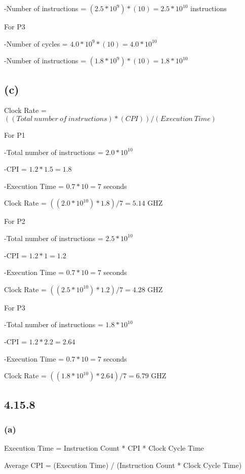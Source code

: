 \documentclass{article}
\begin{document}
    -Number of instructions = $(2.5 * 10^9) * (10) = 2.5 * 10^{10}$ instructions

    \vspace{6pt}

    For P3

    -Number of cycles = ${4.0 * 10^9} * (10) = 4.0 * 10^{10}$

    -Number of instructions = $(1.8 * 10^9) * (10) = 1.8 * 10^{10}$

    \subsection*{(c)}

    Clock Rate = $((Total\ number\ of\ instructions) * (CPI)) / (Execution\ Time)$

    For P1

    -Total number of instructions = $2.0 * 10^{10}$

    -CPI = $1.2 * 1.5 = 1.8$

    -Execution Time = $0.7 * 10 = 7$ seconds

    Clock Rate = $((2.0 * 10^{10}) * 1.8)/7 = 5.14$ GHZ

    For P2

    -Total number of instructions = $2.5 * 10^{10}$

    -CPI = $1.2 * 1 = 1.2$

    -Execution Time = $0.7 * 10 = 7$ seconds

    Clock Rate = $((2.5 * 10^{10}) * 1.2)/7 = 4.28$ GHZ

    For P3 

    -Total number of instructions = $1.8 * 10^{10}$

    -CPI = $1.2 * 2.2 = 2.64$

    -Execution Time = $0.7 * 10 = 7$ seconds

    Clock Rate = $((1.8 * 10^{10}) * 2.64)/7 = 6.79$ GHZ

    \subsection*{4.15.8}

    \subsubsection*{(a)}

    Execution Time = Instruction Count * CPI * Clock Cycle Time

    Average CPI = (Execution Time) / (Instruction Count * Clock Cycle Time)
\end{document}
